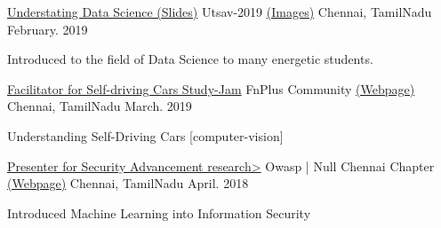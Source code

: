 

\begin{cventries}


  \cventry
    {\href{https://drive.google.com/file/d/1lLDBsU1gFQ10r5X5_tnFzOceWMK0CriR/view?usp=sharing}{Understating Data Science (Slides)}} %
    {Utsav-2019 \href{https://photos.app.goo.gl/3ZDVgiYmo56ZnNbQ6}{(Images)}} %
    {Chennai, TamilNadu} %
    {February. 2019} %
    {
      \begin{cvitems} %
        \item {Introduced to the field of Data Science to many energetic students. }
      \end{cvitems}
    }


  \cventry
    {\href{https://www.meetup.com/geek-meetup-chennai/events/259322931/}{Facilitator for Self-driving Cars Study-Jam}} %
    {FnPlus Community \href{https://www.fnplus.tech/}{(Webpage)}} %
    {Chennai, TamilNadu} %
    {March. 2019} %
    {
      \begin{cvitems} %
        \item {Understanding Self-Driving Cars [computer-vision]}
      \end{cvitems}
    }

  \cventry
    {\href{https://null.co.in/profile/11346-teja-kummarikuntla}{Presenter for Security Advancement research>}} %
    {Owasp | Null Chennai Chapter \href{https://null.co.in/}{(Webpage)}} %
    {Chennai, TamilNadu} %
    {April. 2018} %
    {
      \begin{cvitems} %
        \item {Introduced Machine Learning into Information Security}
      \end{cvitems}
    }

\end{cventries}

